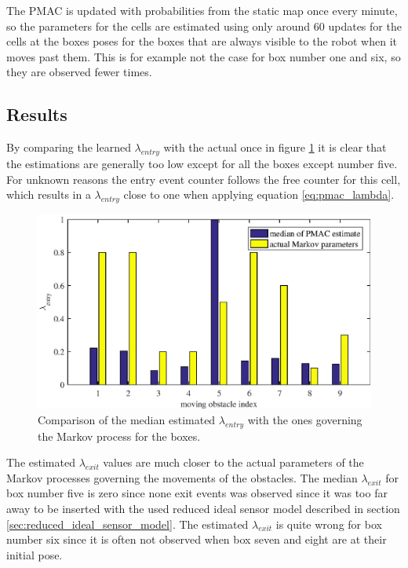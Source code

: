 The PMAC is updated with probabilities from the static map once every minute, so the parameters for the cells are estimated using only around $60$ updates for the cells at the boxes poses for the boxes that are always visible to the robot when it moves past them.
This is for example not the case for box number one and six, so they are observed fewer times.

\subsection{Results}
By comparing the learned $\lambda_{entry}$ with the actual once in figure \ref{fig:compare_learned_markov_entry} it is clear that the estimations are generally too low except for all the boxes except number five.
For unknown reasons the entry event counter follows the free counter for this cell, which results in a $\lambda_{entry}$ close to one when applying equation \vref{eq:pmac_lambda}.

\begin{figure}
    \centering
    \includegraphics[scale=1]{chapters/evaluation/figures/compare_learned_markov_entry}
    \caption{Comparison of the median estimated $\lambda_{entry}$ with the ones governing the Markov process for the boxes.}
    \label{fig:compare_learned_markov_entry}
\end{figure}

The estimated $\lambda_{exit}$ values are much closer to the actual  parameters of the Markov processes governing the movements of the obstacles.
The median $\lambda_{exit}$ for box number five is zero since none exit events was observed since it was too far away to be inserted with the used reduced ideal sensor model described in section \vref{sec:reduced_ideal_sensor_model}.
The estimated $\lambda_{exit}$ is quite wrong for box number six since it is often not observed when box seven and eight are at their initial pose.

